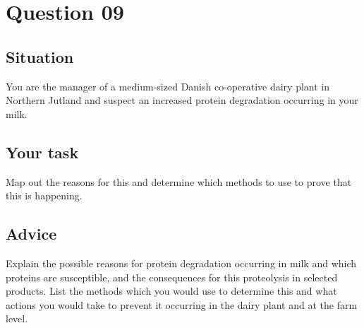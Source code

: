 \setcounter{chapter}{1}

\section*{Question 09}

\subsection*{Situation}
You are the manager of a medium-sized Danish co-operative dairy plant in Northern Jutland and suspect an increased protein degradation occurring in your milk.

\subsection*{Your task}
Map out the reasons for this and determine which methods to use to prove that this is happening.

\subsection*{Advice}
Explain the possible reasons for protein degradation occurring in milk and which proteins are susceptible, and the consequences for this proteolysis in selected products.
List the methods which you would use to determine this and what actions you would take to prevent it occurring in the dairy plant and at the farm level.

\newpage